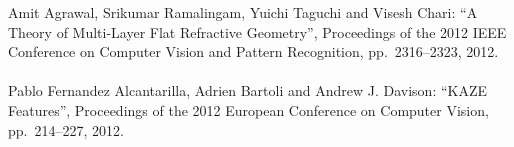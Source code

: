 \begin{mythebibliography}{}
%
%
%
%

%



\newpage
\subsection*{}

\leavevmode \\Amit Agrawal, Srikumar Ramalingam, Yuichi Taguchi and Visesh Chari:
\newblock ``A Theory of Multi-Layer Flat Refractive Geometry'',
\newblock Proceedings of the 2012 IEEE Conference on Computer Vision and Pattern Recognition, pp.~2316--2323, 2012.
\\

\leavevmode \\Pablo Fernandez Alcantarilla, Adrien Bartoli and Andrew J. Davison:
\newblock ``KAZE Features'',
\newblock Proceedings of the 2012 European Conference on Computer Vision, pp.~214--227, 2012.
\\



\end{mythebibliography}
